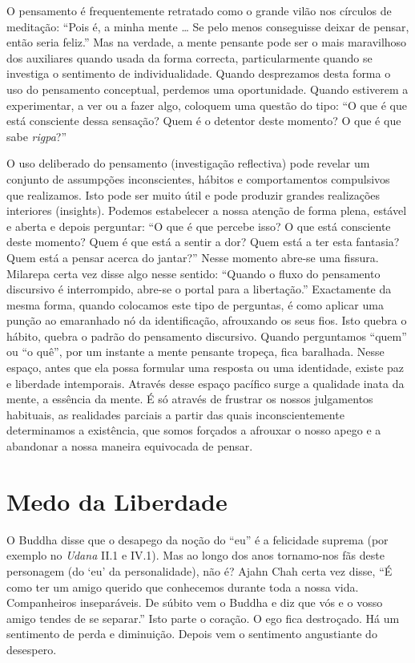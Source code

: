 O pensamento é frequentemente retratado como o grande vilão nos círculos
de meditação: ``Pois é, a minha mente \ldots{} Se pelo menos conseguisse
deixar de pensar, então seria feliz.'' Mas na verdade, a mente pensante
pode ser o mais maravilhoso dos auxiliares quando usada da forma
correcta, particularmente quando se investiga o sentimento de
individualidade. Quando desprezamos desta forma o uso do pensamento
conceptual, perdemos uma oportunidade. Quando estiverem a experimentar,
a ver ou a fazer algo, coloquem uma questão do tipo: ``O que é que está
consciente dessa sensação? Quem é o detentor deste momento? O que é que
sabe \emph{rigpa}?''

O uso deliberado do pensamento (investigação reflectiva) pode revelar um
conjunto de assumpções inconscientes, hábitos e comportamentos
compulsivos que realizamos. Isto pode ser muito útil e pode produzir
grandes realizações interiores (insights). Podemos estabelecer a nossa
atenção de forma plena, estável e aberta e depois perguntar: ``O que é
que percebe isso? O que está consciente deste momento? Quem é que está a
sentir a dor? Quem está a ter esta fantasia? Quem está a pensar acerca
do jantar?'' Nesse momento abre-se uma fissura. Milarepa certa vez disse
algo nesse sentido: ``Quando o fluxo do pensamento discursivo é
interrompido, abre-se o portal para a libertação.'' Exactamente da mesma
forma, quando colocamos este tipo de perguntas, é como aplicar uma
punção ao emaranhado nó da identificação, afrouxando os seus fios. Isto
quebra o hábito, quebra o padrão do pensamento discursivo. Quando
perguntamos ``quem'' ou ``o quê'', por um instante a mente pensante
tropeça, fica baralhada. Nesse espaço, antes que ela possa formular uma
resposta ou uma identidade, existe paz e liberdade intemporais. Através
desse espaço pacífico surge a qualidade inata da mente, a essência da
mente. É só através de frustrar os nossos julgamentos habituais, as
realidades parciais a partir das quais inconscientemente determinamos a
existência, que somos forçados a afrouxar o nosso apego e a abandonar a
nossa maneira equivocada de pensar.

\section{Medo da Liberdade}

O Buddha disse que o desapego da noção do ``eu'' é a felicidade suprema
(por exemplo no \emph{Udana} II.1 e IV.1). Mas ao longo dos anos
tornamo-nos fãs deste personagem (do `eu' da personalidade), não é?
Ajahn Chah certa vez disse, ``É como ter um amigo querido que conhecemos
durante toda a nossa vida. Companheiros inseparáveis. De súbito vem o
Buddha e diz que vós e o vosso amigo tendes de se separar.'' Isto parte
o coração. O ego fica destroçado. Há um sentimento de perda e
diminuição. Depois vem o sentimento angustiante do desespero.

